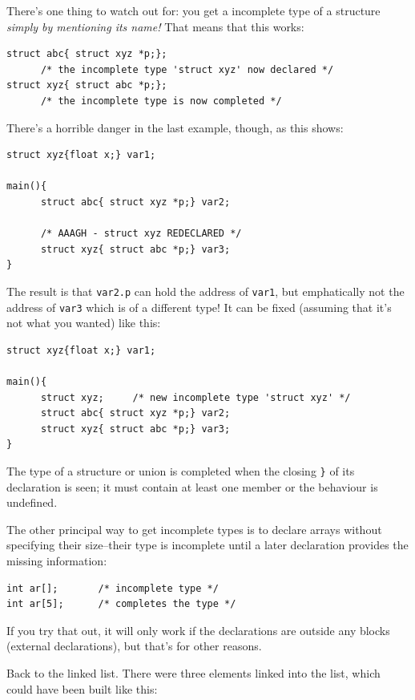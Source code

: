    There's one thing to watch out for: you get a incomplete type of
    a structure \textit{simply by mentioning its name!} That means that this
    works:


   \begin{Verbatim}
struct abc{ struct xyz *p;};
      /* the incomplete type 'struct xyz' now declared */
struct xyz{ struct abc *p;};
      /* the incomplete type is now completed */
\end{Verbatim}

   There's a horrible danger in the last example, though, as this shows:


   \begin{Verbatim}
struct xyz{float x;} var1;

main(){
      struct abc{ struct xyz *p;} var2;

      /* AAAGH - struct xyz REDECLARED */
      struct xyz{ struct abc *p;} var3;
}
\end{Verbatim}

   The result is that \texttt{var2.p} can hold the address of
    \texttt{var1}, but emphatically not the address of \texttt{var3}
    which is of a different type! It can be fixed (assuming that it's not what
    you wanted) like this:


   \begin{Verbatim}
struct xyz{float x;} var1;

main(){
      struct xyz;     /* new incomplete type 'struct xyz' */
      struct abc{ struct xyz *p;} var2;
      struct xyz{ struct abc *p;} var3;
}
\end{Verbatim}

   The type of a structure or union is completed when the closing \texttt{\}} of its
    declaration is seen; it must contain at least one member or the behaviour
    is undefined.


   The other principal way to get incomplete types is to declare arrays
    without specifying their size--their type is incomplete until a later
    declaration provides the missing information:


   \begin{Verbatim}
int ar[];       /* incomplete type */
int ar[5];      /* completes the type */
\end{Verbatim}

   If you try that out, it will only work if the declarations are outside
    any blocks (external declarations), but that's for other reasons.


   Back to the linked list. There were three elements linked into the list,
    which could have been built like this:


